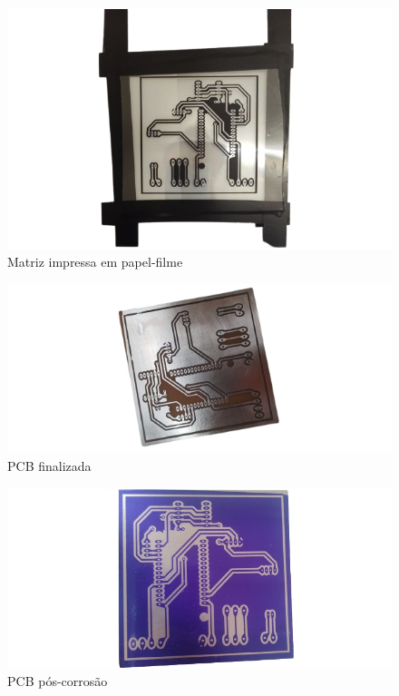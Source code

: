 \begin{figure}[!htb] \centering
  \caption{Matriz impressa em papel-filme} \label{figura:pcb-matriz}
  \begin{varwidth}{\linewidth}
    \includegraphics[width=16cm]{figuras/pcb-matriz.png}
  \end{varwidth}
\end{figure}

\newpage

\begin{figure}[!htb] \centering
  \caption{PCB finalizada} \label{figura:pcb-pos}
  \begin{varwidth}{\linewidth}
    \includegraphics[width=16cm]{figuras/pcb-pos.png}
  \end{varwidth}
\end{figure}

\begin{figure}[!htb] \centering
  \caption{PCB pós-corrosão} \label{figura:pcb-stg1}
  \begin{varwidth}{\linewidth}
    \includegraphics[width=16cm]{figuras/pcb-stg1.png}
  \end{varwidth}
\end{figure}


